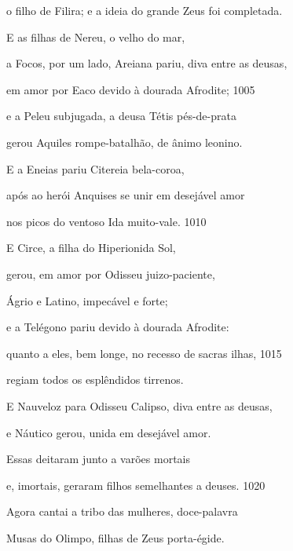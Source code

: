 o filho de Filira; e a ideia do grande Zeus foi completada.

\quad{}E as filhas de Nereu, o velho do mar,

a Focos, por um lado, Areiana pariu, diva entre as deusas,

em amor por Eaco devido à dourada Afrodite; \num{1005}

e a Peleu subjugada, a deusa Tétis pés-de-prata

gerou Aquiles rompe-batalhão, de ânimo leonino.

\quad{}E a Eneias pariu Citereia bela-coroa,

após ao herói Anquises se unir em desejável amor

nos picos do ventoso Ida muito-vale. \num{1010}

\quad{}E Circe, a filha do Hiperionida Sol,

gerou, em amor por Odisseu juizo-paciente,

Ágrio e Latino, impecável e forte;

e a Telégono pariu devido à dourada Afrodite:

quanto a eles, bem longe, no recesso de sacras ilhas, \num{1015}

regiam todos os esplêndidos tirrenos.

\quad{}E Nauveloz para Odisseu Calipso, diva entre as deusas,

e Náutico gerou, unida em desejável amor.

\quad{}Essas deitaram junto a varões mortais

e, imortais, geraram filhos semelhantes a deuses. \num{1020}

Agora cantai a tribo das mulheres, doce-palavra

Musas do Olimpo, filhas de Zeus porta-égide.

\endgroup